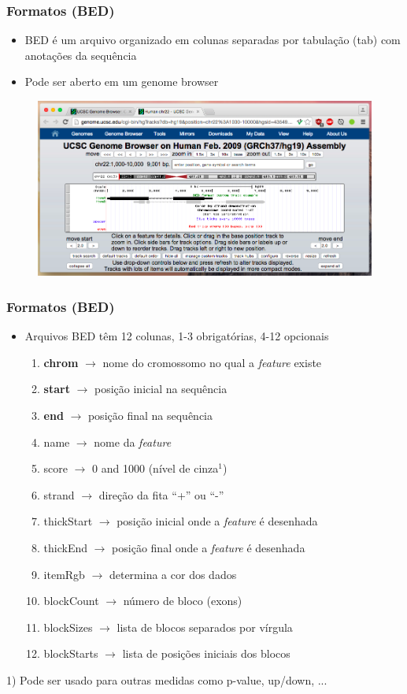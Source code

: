 \documentclass{beamer}
\begin{document}
	\begin{frame}\frametitle{Formatos (BED)}
		\begin{itemize}
		\item BED é um arquivo organizado em colunas separadas por tabulação (tab) com anotações da sequência
		\item Pode ser aberto em um genome browser
		\end{itemize}
		\begin{figure}[ht]
		\centering
		\includegraphics[scale=0.25]{img/bed.png}
		\end{figure}
	\end{frame}
%
%
	\begin{frame}\frametitle{Formatos (BED)}
		\begin{itemize}
		\item Arquivos BED têm 12 colunas, 1-3 obrigatórias, 4-12 opcionais
		\begin{enumerate}
		\item \textbf{chrom} $\rightarrow$ nome do cromossomo no qual a \textit{feature} existe
		\item \textbf{start} $\rightarrow$ posição inicial na sequência
		\item \textbf{end} $\rightarrow$ posição final na sequência
		\item name $\rightarrow$ nome da \textit{feature}
		\item score $\rightarrow$ 0 and 1000 (nível de cinza$^1$)
		\item strand $\rightarrow$ direção da fita ``+'' ou ``-''
		\item thickStart $\rightarrow$ posição inicial onde a \textit{feature} é desenhada
		\item thickEnd $\rightarrow$ posição final onde a \textit{feature} é desenhada
		\item itemRgb $\rightarrow$ determina a cor dos dados
		\item blockCount $\rightarrow$ número de bloco (exons)
		\item blockSizes $\rightarrow$ lista de blocos separados por vírgula
		\item blockStarts $\rightarrow$ lista de posições iniciais dos blocos
		\end{enumerate}
		\end{itemize}
		\tiny{1) Pode ser usado para outras medidas como p-value, up/down, ...}
	\end{frame}
\end{document}
